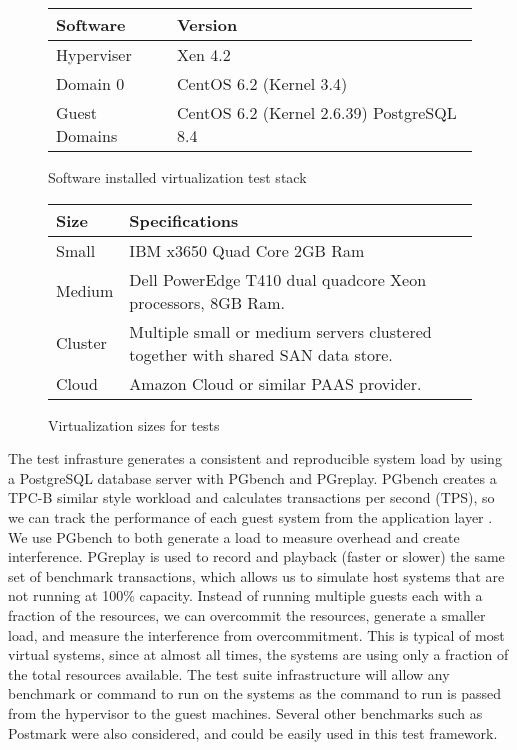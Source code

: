 \begin{figure}[lh]
\begin{tabular}{ l p{5cm} }
  Software & Version \\
  \hline
  Hyperviser & Xen 4.2 \\
  Domain 0 & CentOS 6.2 (Kernel 3.4) \\
  Guest Domains & CentOS 6.2 (Kernel 2.6.39) PostgreSQL 8.4 \\
  \hline
\end{tabular}
\caption{Software installed virtualization test stack}
\label{fig:softStack}
\end{figure}

\begin{figure}[rh]
\begin{tabular}{ l p{5cm} }
  Size & Specifications \\
  \hline
  Small & IBM x3650 Quad Core 2GB Ram \\
  Medium & Dell PowerEdge T410 dual quadcore Xeon processors, 8GB Ram. \\
  Cluster & Multiple small or medium servers clustered together with shared SAN data store. \\
  Cloud & Amazon Cloud or similar PAAS provider. \\
  \hline
\end{tabular}
\caption{Virtualization sizes for tests}
\label{fig:virtSize}
\end{figure}

\indent The test infrasture generates a consistent and reproducible system load by using a PostgreSQL database server with PGbench and PGreplay. 
PGbench creates a TPC-B similar style workload and calculates transactions per second (TPS), so we can track the performance of each guest system from the application layer \cite{pgTune}.  
We use PGbench to both generate a load to measure overhead and create interference.
PGreplay is used to record and playback (faster or slower) the same set of benchmark transactions, which allows us to simulate host systems that are not running at 100\% capacity.  
Instead of running multiple guests each with a fraction of the resources, we can overcommit the resources, generate a smaller load, and measure the interference from overcommitment.
This is typical of most virtual systems, since at almost all times, the systems are using only a fraction of the total resources available.  
The test suite infrastructure will allow any benchmark or command to run on the systems as the command to run is passed from the hypervisor to the guest machines.
Several other benchmarks such as Postmark \cite{katcher} were also considered, and could be easily used in this test framework.

